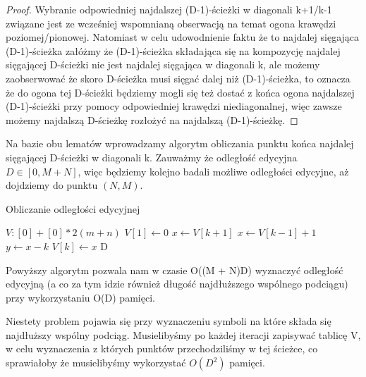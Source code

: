\documentclass[12pt]{article}
\begin{document}
\begin{proof}
Wybranie odpowiedniej najdalszej (D-1)-ścieżki w diagonali k+1/k-1 związane jest ze wcześniej wspomnianą obserwacją na temat ogona krawędzi poziomej/pionowej. Natomiast w celu udowodnienie faktu że to najdalej sięgająca (D-1)-ścieżka załóżmy że (D-1)-ścieżka składająca się na kompozycję najdalej sięgającej D-ścieżki nie jest najdalej sięgająca w diagonali k, ale możemy zaobserwować że skoro D-ścieżka musi sięgać dalej niż (D-1)-ścieżka, to oznacza że do ogona tej D-ścieżki będziemy mogli się też dostać z końca ogona najdalszej (D-1)-ścieżki przy pomocy odpowiedniej krawędzi niediagonalnej, więc zawsze możemy najdalszą D-ścieżkę rozłożyć na najdalszą (D-1)-ścieżkę.
\end{proof}

Na bazie obu lematów wprowadzamy algorytm obliczania punktu końca najdalej sięgającej D-ścieżki w diagonali k. Zauważmy że odległość edycyjna $D \in [0, M+N]$, więc będziemy kolejno badali możliwe odległości edycyjne, aż dojdziemy do punktu $(N,M)$.

\begin{algorithm}
\caption{Obliczanie odległości edycyjnej}
\begin{algorithmic}
\STATE $V:[0] + [0] * 2(m+n)$
\STATE $V[1] \leftarrow 0$
            \STATE $x \leftarrow V[k+1]$
        \ELSE
            \STATE $x \leftarrow V[k-1] + 1$
        \ENDIF
        \STATE $y \leftarrow x-k$
            \STATE $V[k] \leftarrow x$ 
        \ENDWHILE
            \RETURN D
        \ENDIF
    \ENDFOR
\ENDFOR
\end{algorithmic}
\end{algorithm}

\vspace{5mm}

Powyższy algorytm pozwala nam w czasie O((M + N)D) wyznaczyć odległość edycyjną (a co za tym idzie również długość najdłuższego wspólnego podciągu) przy wykorzystaniu O(D) pamięci.

Niestety problem pojawia się przy wyznaczeniu symboli na które składa się najdłuższy wspólny podciąg. Musielibyśmy po każdej iteracji zapisywać tablicę V, w celu wyznaczenia z których punktów przechodziliśmy w tej ścieżce, co sprawiałoby że musielibyśmy wykorzystać $O(D^2)$ pamięci.
\end{document}
